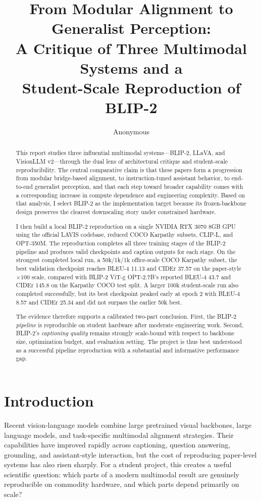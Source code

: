 \documentclass[11pt]{article}
\title{From Modular Alignment to Generalist Perception:\\
A Critique of Three Multimodal Systems and a\\
Student-Scale Reproduction of BLIP-2}
\author{Anonymous}
\begin{document}
\maketitle

\begin{abstract}
This report studies three influential multimodal systems---BLIP-2, LLaVA, and VisionLLM v2---through the dual lens of architectural critique and student-scale reproducibility. The central comparative claim is that these papers form a progression from modular bridge-based alignment, to instruction-tuned assistant behavior, to end-to-end generalist perception, and that each step toward broader capability comes with a corresponding increase in compute dependence and engineering complexity. Based on that analysis, I select BLIP-2 as the implementation target because its frozen-backbone design preserves the clearest downscaling story under constrained hardware.

I then build a local BLIP-2 reproduction on a single NVIDIA RTX 3070 8GB GPU using the official LAVIS codebase, reduced COCO Karpathy subsets, CLIP-L, and OPT-350M. The reproduction completes all three training stages of the BLIP-2 pipeline and produces valid checkpoints and caption outputs for each stage. On the strongest completed local run, a 50k/1k/1k office-scale COCO Karpathy subset, the best validation checkpoint reaches BLEU-4 11.13 and CIDEr 37.57 on the paper-style $\times 100$ scale, compared with BLIP-2 ViT-g OPT-2.7B's reported BLEU-4 43.7 and CIDEr 145.8 on the Karpathy COCO test split. A larger 100k student-scale run also completed successfully, but its best checkpoint peaked early at epoch 2 with BLEU-4 8.57 and CIDEr 25.34 and did not surpass the earlier 50k best.

The evidence therefore supports a calibrated two-part conclusion. First, the BLIP-2 \emph{pipeline} is reproducible on student hardware after moderate engineering work. Second, BLIP-2's \emph{captioning quality} remains strongly scale-bound with respect to backbone size, optimization budget, and evaluation setting. The project is thus best understood as a successful pipeline reproduction with a substantial and informative performance gap.
\end{abstract}

\section{Introduction}
Recent vision-language models combine large pretrained visual backbones, large language models, and task-specific multimodal alignment strategies. Their capabilities have improved rapidly across captioning, question answering, grounding, and assistant-style interaction, but the cost of reproducing paper-level systems has also risen sharply. For a student project, this creates a useful scientific question: which parts of a modern multimodal result are genuinely reproducible on commodity hardware, and which parts depend primarily on scale?
\end{document}
